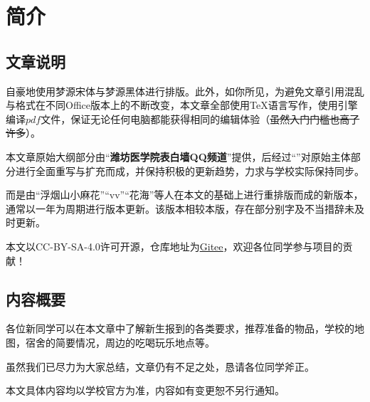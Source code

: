 \chapter[简介]{简介}
\section[文章说明]{文章说明}

自豪地使用梦源宋体与梦源黑体进行排版。此外，如你所见，为避免文章引用混乱与格式在不同Office版本上的不断改变，本文章全部使用\TeX 语言写作，使用\XeLaTeX 引擎编译$pdf$文件，保证无论任何电脑都能获得相同的编辑体验（\sout{虽然入门门槛也高了许多}）。

本文章原始大纲部分由“\textbf{潍坊医学院表白墙QQ频道}”提供，后经过“\textbf{}”对原始主体部分进行全面重写与扩充而成，并保持积极的更新趋势，力求与学校实际保持同步。

而\textbf{}是由“浮烟山小麻花”“vv”“花海”等人在本文的基础上进行重排版而成的新版本，通常以一年为周期进行版本更新。该版本相较本版，存在部分别字及不当措辞未及时更新。

\bigbreak
\textbf{}

本文以CC-BY-SA-4.0许可开源，仓库地址为\uline{\href{https://gitee.com/mikazo/guide_for_freshman}{Gitee}}，欢迎各位同学参与项目的贡献！

\section[内容概要]{内容概要}

各位新同学可以在本文章中了解新生报到的各类要求，推荐准备的物品，学校的地图，宿舍的简要情况，周边的吃喝玩乐地点等。

虽然我们已尽力为大家总结，文章仍有不足之处，恳请各位同学斧正。

本文具体内容均以学校官方为准，内容如有变更恕不另行通知。